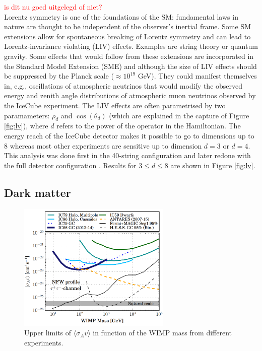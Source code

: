 \textcolor{red}{is dit  nu goed uitgelegd of niet?\\}
Lorentz symmetry is one of the foundations of the SM: fundamental laws in nature are thought to be independent of the observer's inertial frame. Some SM extensions allow for spontaneous breaking of Lorentz symmetry and can lead to Lorentz-invariance violating (LIV) effects. Examples are string theory or quantum gravity. Some effects that would follow from these extensions are incorporated in the Standard Model Extension (SME) \cite{Colladay:1998fq} and although the size of LIV effects should be suppressed by the Planck scale ($\approx 10^{19}$ GeV). They could manifest themselves in, e.g., oscillations of atmospheric neutrinos that would modify the observed energy and zenith angle distributions of atmospheric muon neutrinos observed by the IceCube experiment. The LIV effects are often parametrised by two paramameters: $\rho_d$ and $\cos \left(\theta_d\right)$ (which are explained in the capture of Figure \ref{fig:lv}), where $d$ refers to the power of the operator in the Hamiltonian. The energy reach of the IceCube detector makes it possible to go to dimensions up to 8 whereas most other experiments are sensitive up to dimension $d=3$ or $d=4$. This analysis was done first in the 40-string configuration \cite{Abbasi:2010kx} and later redone with the full detector configuration \cite{Aartsen:2017ibm}. Results for $3 \leq d \leq 8$ are shown in Figure \ref{fig:lv}.

\subsection{Dark matter}
\label{subsubsec:DM}

\begin{figure}[ht]
\centering
\includegraphics[width=0.65\textwidth]{chapter5/img/dm.png}
\caption{Upper limits of $\langle \sigma_A v\rangle$ in function of the WIMP mass from different experiments.}
\label{fig:dm}
\end{figure}

